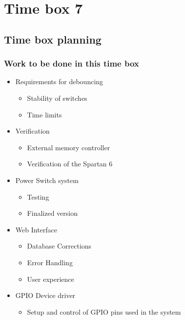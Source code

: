 \section{Time box 7}
\listoftodos
\subsection{Time box planning}

\begin{figure}[H]
	\begin{centering}
	\end{centering}
\end{figure}

\subsubsection{Work to be done in this time box}
\begin{itemize}
	\item Requirements for debouncing
	\begin{itemize}
		\item Stability of switches
		\item Time limits
	\end{itemize}
	\item Verification
	\begin{itemize}
		\item External memory controller
		\item Verification of the Spartan 6
	\end{itemize}
	\item Power Switch system
		\begin{itemize}
			\item Testing
			\item Finalized version
		\end{itemize}
	\item Web Interface
		\begin{itemize}
			\item Database Corrections
			\item Error Handling
			\item User experience
		\end{itemize}
	\item GPIO Device driver
	\begin{itemize}
		\item Setup and control of GPIO pins used in the system
	\end{itemize}
\end{itemize}

